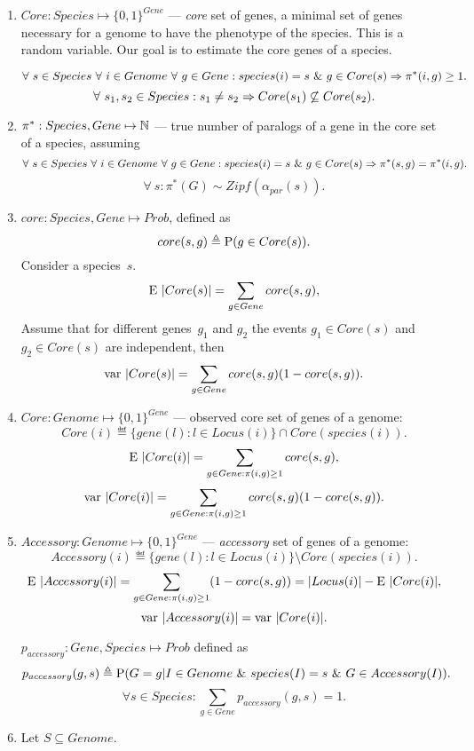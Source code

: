 \documentclass[10pt,a4paper]{article}
\theoremstyle{plain} \newtheorem{Lem}{Lemma}
\begin{document}
\begin{enumerate}
\item
$Core : Species \mapsto \{0,1\}^{Gene}$ --- {\em core} set of genes, a minimal set of genes necessary for a genome to have the phenotype of the species.
This is a random variable.
Our goal is to estimate the core genes of a species.

$$   \forall \  s \in Species
   \ \forall \  i \in Genome
   \ \forall \  g \in Gene
   : species(i) = s \ \& \  g \in Core(s)
     \Rightarrow \pi^*(i,g) \ge 1.
$$
$$ \forall \  s_1, s_2 \in Species: s_1 \ne s_2 \Rightarrow Core(s_1) \not \subseteq Core(s_2). $$



\item
$\pi^*: Species, Gene \mapsto \mathbb N$ --- true number of paralogs of a gene in the core set of a species, assuming
$$   \forall \  s \in Species
   \ \forall \  i \in Genome
   \ \forall \  g \in Gene
   : species(i) = s \ \& \  g \in Core(s)
     \Rightarrow \pi^*(s,g) = \pi^*(i,g).
$$
$$ \forall \ s : \pi^*(G) \sim \mathit{Zipf}(\alpha_{par}(s)). $$


\item
$core : Species, Gene \mapsto Prob$, defined as
$$ core (s,g) \triangleq \mathrm P(g \in Core(s)). $$
Consider a species~$s$.
$$ \mathrm E \  |Core(s)| = \sum_{g \in Gene} core(s,g), $$
Assume that for different genes~$g_1$ and $g_2$ the events $g_1 \in Core(s)$ and $g_2 \in Core(s)$ are independent, then
$$ \mathrm {var} \  |Core(s)| = \sum_{g \in Gene} core(s,g) (1 - core(s,g)). $$

\item
$Core: Genome \mapsto \{0,1\}^{Gene}$ --- observed core set of genes of a genome:
$$ Core(i) \eqdef \{gene(l): l \in Locus(i)\} \cap Core(species(i)). $$
$$ \mathrm E \  |Core(i)| = \sum_{g \in Gene: \pi(i,g) \ge 1} core(s,g), $$
$$ \mathrm {var} \  |Core(i)| = \sum_{g \in Gene: \pi(i,g) \ge 1} core(s,g) (1 - core(s,g)). $$

\item
$Accessory: Genome \mapsto \{0,1\}^{Gene}$ --- {\em accessory} set of genes of a genome:
$$Accessory(i) \eqdef \{gene(l): l \in Locus(i)\} \setminus Core(species(i)). $$
$$ \mathrm E \  |Accessory(i)| = \sum_{g \in Gene: \pi(i,g) \ge 1} (1-core(s,g)) = |Locus(i)| - \mathrm E \  |Core(i)|, $$
$$ \mathrm {var} \  |Accessory(i)| = \mathrm {var} \  |Core(i)|. $$


$p_{accessory}: Gene, Species \mapsto Prob$ defined as
$$ p_{accessory} (g,s) \triangleq \mathrm P(G = g | I \in Genome \ \& \  species(I) = s \ \& \  G \in Accessory(I)). $$
$$ \forall s \in Species: \sum_{g \in Gene} p_{accessory}(g,s)= 1. $$


\item
Let $S \subseteq Genome$.


\end{enumerate}
\end{document}
